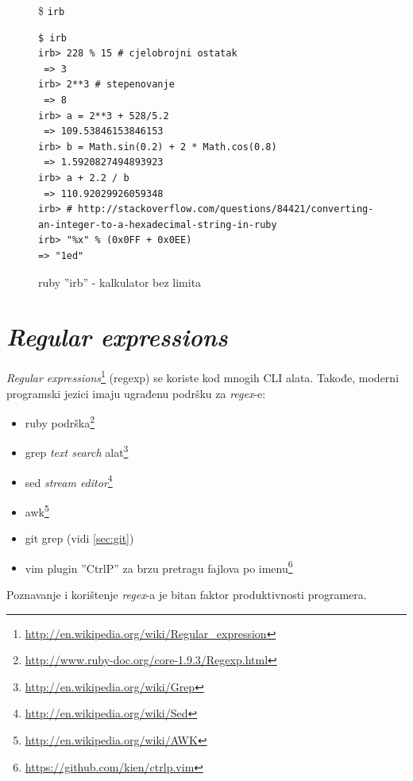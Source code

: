 \documentclass[times, utf8, seminar]{fit}
\begin{document}
\begin{figure}[H]
\$ \verb+irb+

\begin{lstlisting}
$ irb
irb> 228 % 15 # cjelobrojni ostatak
 => 3 
irb> 2**3 # stepenovanje
 => 8 
irb> a = 2**3 + 528/5.2
 => 109.53846153846153 
irb> b = Math.sin(0.2) + 2 * Math.cos(0.8)
 => 1.5920827494893923 
irb> a + 2.2 / b
 => 110.92029926059348
irb> # http://stackoverflow.com/questions/84421/converting-an-integer-to-a-hexadecimal-string-in-ruby
irb> "%x" % (0x0FF + 0x0EE) 
=> "1ed" 

\end{lstlisting}

\caption{ruby ''irb'' - kalkulator bez limita}
\end{figure}

\section{\emph{Regular expressions}}

\emph{Regular expressions}\footnote{\url{http://en.wikipedia.org/wiki/Regular_expression}} (regexp) se koriste kod mnogih CLI alata. Takođe, moderni programski jezici imaju ugrađenu podršku za \emph{regex}-e:
\begin{itemize}
   \item ruby podrška\footnote{\url{http://www.ruby-doc.org/core-1.9.3/Regexp.html}}
   \item grep \emph{text search} alat\footnote{\url{http://en.wikipedia.org/wiki/Grep}}
   \item sed \emph{stream editor}\footnote{\url{http://en.wikipedia.org/wiki/Sed}}
   \item awk\footnote{\url{http://en.wikipedia.org/wiki/AWK}}
   \item git grep (vidi \ref{sec:git})
   \item vim plugin ''CtrlP'' za brzu pretragu fajlova po imenu\footnote{\url{https://github.com/kien/ctrlp.vim}}
\end{itemize}

Poznavanje i korištenje \emph{regex}-a je bitan faktor produktivnosti programera.
 



\end{document}
